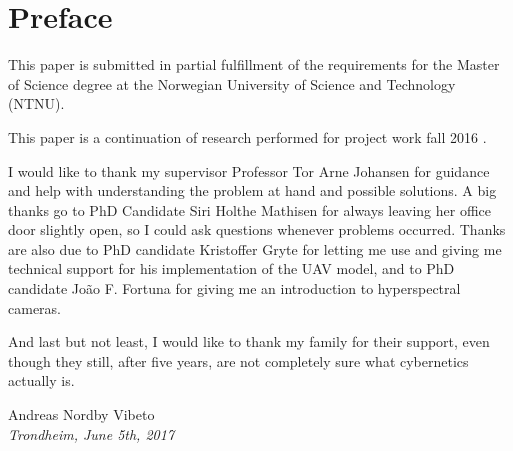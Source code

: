\chapter*{Preface}

\vspace{1cm}

This paper is submitted in partial fulfillment of the requirements for the Master of Science degree at the Norwegian University of Science and Technology (NTNU).

This paper is a continuation of research performed for project work fall 2016 \cite{prosjekt}. 

I would like to thank my supervisor Professor Tor Arne Johansen for guidance and help with understanding the problem at hand and possible solutions. A big thanks go to PhD Candidate Siri Holthe Mathisen for always leaving her office door slightly open, so I could ask questions whenever problems occurred. Thanks are also due to PhD candidate Kristoffer Gryte for letting me use and giving me technical support for his implementation of the UAV model, and to PhD candidate João F. Fortuna for giving me an introduction to hyperspectral cameras.

And last but not least, I would like to thank my family for their support, even though they still, after five years, are not completely sure what cybernetics actually is.

\vspace{2cm}

\begin{center}
    Andreas Nordby Vibeto \\
    \emph{Trondheim, June 5th, 2017}
\end{center}